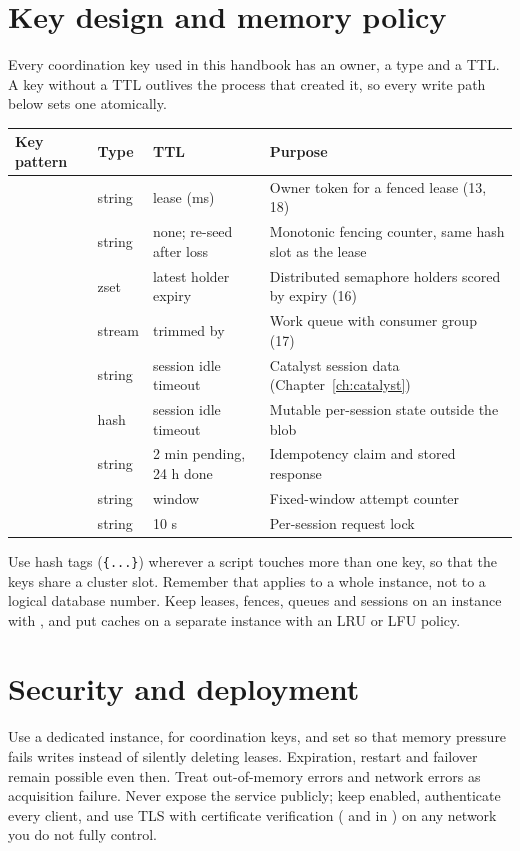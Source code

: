 \section{Key design and memory policy}
Every coordination key used in this handbook has an owner, a type and a TTL. A key without a TTL outlives the process that created it, so every write path below sets one atomically.
\begin{longtable}{L{.26\linewidth}L{.10\linewidth}L{.21\linewidth}L{.30\linewidth}}\toprule Key pattern & Type & TTL & Purpose \\ \midrule\endhead
{} & string & lease (ms) & Owner token for a fenced lease (13, 18) \\
 & string & none; re-seed after loss & Monotonic fencing counter, same hash slot as the lease \\
 & zset & latest holder expiry & Distributed semaphore holders scored by expiry (16) \\
 & stream & trimmed by  & Work queue with consumer group (17) \\
 & string & session idle timeout & Catalyst session data (Chapter~\ref{ch:catalyst}) \\
 & hash & session idle timeout & Mutable per-session state outside the blob \\
 & string & 2 min pending, 24 h done & Idempotency claim and stored response \\
 & string & window & Fixed-window attempt counter \\
 & string & 10 s & Per-session request lock \\
\bottomrule\end{longtable}
Use hash tags (\texttt{\{...\}}) wherever a script touches more than one key, so that the keys share a cluster slot. Remember that  applies to a whole instance, not to a logical database number. Keep leases, fences, queues and sessions on an instance with , and put caches on a separate instance with an LRU or LFU policy.

\section{Security and deployment}\label{sec:redis-security}
Use a dedicated instance, for coordination keys, and set  so that memory pressure fails writes instead of silently deleting leases. Expiration, restart and failover remain possible even then. Treat out-of-memory errors and network errors as acquisition failure. Never expose the service publicly; keep  enabled, authenticate every client, and use TLS with certificate verification ( and  in ) on any network you do not fully control.

